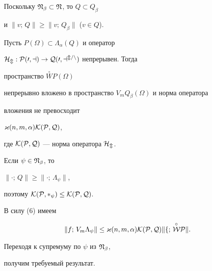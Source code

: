 Поскольку $\frak N_\beta\subset\frak N$, то $Q\subset Q_\beta$ 


и $\|v;\,Q\|\ge\|v;\,Q_\beta\|$ ($v\in Q$). 


 




\begin{thm} 


Пусть $P(\Omega)\subset\Lambda_\alpha(Q)$ и оператор 


$\cal H_m:P(0,a)\to Q(0,a^{m/n})$ непрерывен. Тогда 


пространство $\overset{\circ}{W}P(\Omega)$ 


непрерывно вложено в пространство $V_mQ_\beta(\Omega)$ и норма оператора 


вложения не превосходит 


$\varkappa(n,m,\alpha)\cal K(P,Q)$, 


где $\cal K(P,Q)$ --- норма оператора $\cal H_m$. 


\end{thm} 


 


\begin{pf} Если $\psi\in\frak N_\beta$, то 


$\|\cdot;\,Q\|\ge\|\cdot;\,\Lambda_\psi\|$, 


поэтому $\cal K(P,\Lambda_\psi)\le\cal K(P,Q)$. 


В силу (6) имеем 


$$ 


\|f;\,V_m\Lambda_\psi\| \le \varkappa(n,m,\alpha)\cal K(P,Q) 


\|f;\,\overset{\circ}{W}P\|. 


$$ 


Переходя к супремуму по $\psi$ из $\frak N_\beta$, 


получим требуемый результат. 


\end{pf} 


 





